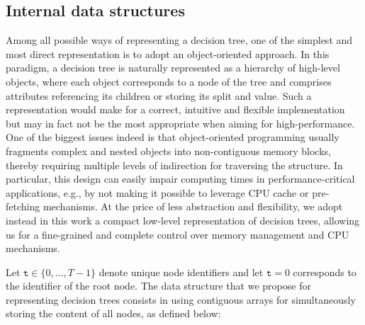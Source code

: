 \subsection{Internal data structures}

Among all possible ways of representing a decision tree, one of the simplest and most
direct representation is to adopt an object-oriented approach. In this
paradigm, a decision tree is naturally represented as a hierarchy of high-level
objects, where each object corresponds to a node of the tree and comprises
attributes referencing its children or storing its split and value. Such a
representation would make for a correct, intuitive and flexible implementation
but may in fact not be the most appropriate when aiming for high-performance.
One of the biggest issues indeed is that object-oriented programming usually
fragments complex and nested objects into non-contiguous memory blocks, thereby
requiring multiple levels of indirection for traversing the structure. In
particular, this design can easily impair computing times in
performance-critical applications, e.g., by not making it possible to leverage CPU cache or
pre-fetching mechanisms.
At the price of less abstraction and flexibility, we adopt instead in this work
a compact low-level representation of decision trees, allowing us for a fine-grained
and complete control over memory management and CPU mechanisms.

Let $\texttt{t}\in \{0,\dots,T-1\}$ denote unique node identifiers and let
$\texttt{t}=0$ corresponds to the identifier of the root node. The data
structure that we propose for representing decision trees consists in using
contiguous arrays for simultaneously storing the content of all nodes, as
defined below:

